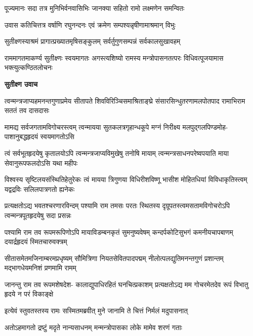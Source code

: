 \twolineshloka
{पूज्यमानः सदा तत्र मुनिभिर्वनवासिभिः}
{जानक्या सहितो रामो लक्ष्मणेन समन्वितः} %

\twolineshloka
{उवास कतिचित्तत्र वर्षाणि रघुनन्दनः}
{एवं क्रमेण सम्पश्यन्नृषीणामाश्रमान् विभुः} %

\twolineshloka
{सुतीक्ष्णस्याश्रमं प्रागात्प्रख्यातमृषिसङ्कुलम्}
{सर्वर्तुगुणसम्पन्नं सर्वकालसुखावहम्} %

\threelineshloka
{राममागतमाकर्ण्य सुतीक्ष्णः स्वयमागतः}
{अगस्त्यशिष्यो रामस्य मन्त्रोपासनतत्परः}
{विधिवत्पूजयामास भक्त्युत्कण्ठितलोचनः} %

\textbf{सुतीक्ष्ण उवाच}

\fourlineindentedshloka
{त्वन्मन्त्रजाप्यहमनन्तगुणाप्रमेय}
{सीतापते शिवविरिञ्चिसमाश्रिताङ्घ्रे}
{संसारसिन्धुतरणामलपोतपाद}
{रामाभिराम सततं तव दासदासः} %

\fourlineindentedshloka
{मामद्य सर्वजगतामविगोचरस्त्वम्}
{त्वन्मायया सुतकलत्रगृहान्धकूपे}
{मग्नं निरीक्ष्य मलपुद्गलपिण्डमोह-}
{पाशानुबद्धहृदयं स्वयमागतोऽसि} %

\fourlineindentedshloka
{त्वं सर्वभूतहृदयेषु कृतालयोऽपि}
{त्वन्मन्त्रजाप्यविमुखेषु तनोषि मायाम्}
{त्वन्मन्त्रसाधनपरेष्वपयाति माया}
{सेवानुरूपफलदोऽसि यथा महीपः} %

\fourlineindentedshloka
{विश्वस्य सृष्टिलयसंस्थितिहेतुरेकः}
{त्वं मायया त्रिगुणया विधिरीशविष्णू}
{भासीश मोहितधियां विविधाकृतिस्त्वम्}
{यद्वद्रविः सलिलपात्रगतो ह्यनेकः} %

\fourlineindentedshloka
{प्रत्यक्षतोऽद्य भवतश्चरणारविन्दम्}
{पश्यामि राम तमसः परतः स्थितस्य}
{दृग्रूपतस्त्वमसतामविगोचरोऽपि}
{त्वन्मन्त्रपूतहृदयेषु सदा प्रसन्नः} %

\fourlineindentedshloka
{पश्यामि राम तव रूपमरूपिणोऽपि}
{मायाविडम्बनकृतं सुमनुष्यवेषम्}
{कन्दर्पकोटिसुभगं कमनीयचापबाणम्}
{दयार्द्रहृदयं स्मितचारुवक्त्रम्} %

\fourlineindentedshloka
{सीतासमेतमजिनाम्बरमप्रधृष्यम्}
{सौमित्रिणा नियतसेवितपादपद्मम्}
{नीलोत्पलद्युतिमनन्तगुणं प्रशान्तम्}
{मद्भागधेयमनिशं प्रणमामि रामम्} %

\fourlineindentedshloka
{जानन्तु राम तव रूपमशेषदेश-}
{कालाद्युपाधिरहितं घनचित्प्रकाशम्}
{प्रत्यक्षतोऽद्य मम गोचरमेतदेव}
{रूपं विभातु हृदये न परं विकाङ्क्षे} %

\twolineshloka
{इत्येवं स्तुवतस्तस्य रामः सस्मितमब्रवीत्}
{मुने जानामि ते चित्तं निर्मलं मदुपासनात्} %

\twolineshloka
{अतोऽहमागतो द्रष्टुं मदृते नान्यसाधनम्}
{मन्मन्त्रोपासका लोके मामेव शरणं गताः} %

